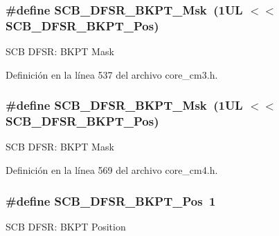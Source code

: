 \subsubsection[{\texorpdfstring{S\+C\+B\+\_\+\+D\+F\+S\+R\+\_\+\+B\+K\+P\+T\+\_\+\+Msk}{SCB_DFSR_BKPT_Msk}}]{\setlength{\rightskip}{0pt plus 5cm}\#define S\+C\+B\+\_\+\+D\+F\+S\+R\+\_\+\+B\+K\+P\+T\+\_\+\+Msk~(1\+U\+L $<$$<$ S\+C\+B\+\_\+\+D\+F\+S\+R\+\_\+\+B\+K\+P\+T\+\_\+\+Pos)}\hypertarget{group___c_m_s_i_s___s_c_b_ga609edf8f50bc49adb51ae28bcecefe1f}{}\label{group___c_m_s_i_s___s_c_b_ga609edf8f50bc49adb51ae28bcecefe1f}
S\+CB D\+F\+SR\+: B\+K\+PT Mask 

Definición en la línea 537 del archivo core\+\_\+cm3.\+h.

\subsubsection[{\texorpdfstring{S\+C\+B\+\_\+\+D\+F\+S\+R\+\_\+\+B\+K\+P\+T\+\_\+\+Msk}{SCB_DFSR_BKPT_Msk}}]{\setlength{\rightskip}{0pt plus 5cm}\#define S\+C\+B\+\_\+\+D\+F\+S\+R\+\_\+\+B\+K\+P\+T\+\_\+\+Msk~(1\+U\+L $<$$<$ S\+C\+B\+\_\+\+D\+F\+S\+R\+\_\+\+B\+K\+P\+T\+\_\+\+Pos)}\hypertarget{group___c_m_s_i_s___s_c_b_ga609edf8f50bc49adb51ae28bcecefe1f}{}\label{group___c_m_s_i_s___s_c_b_ga609edf8f50bc49adb51ae28bcecefe1f}
S\+CB D\+F\+SR\+: B\+K\+PT Mask 

Definición en la línea 569 del archivo core\+\_\+cm4.\+h.

\subsubsection[{\texorpdfstring{S\+C\+B\+\_\+\+D\+F\+S\+R\+\_\+\+B\+K\+P\+T\+\_\+\+Pos}{SCB_DFSR_BKPT_Pos}}]{\setlength{\rightskip}{0pt plus 5cm}\#define S\+C\+B\+\_\+\+D\+F\+S\+R\+\_\+\+B\+K\+P\+T\+\_\+\+Pos~1}\hypertarget{group___c_m_s_i_s___s_c_b_gaf28fdce48655f0dcefb383aebf26b050}{}\label{group___c_m_s_i_s___s_c_b_gaf28fdce48655f0dcefb383aebf26b050}
S\+CB D\+F\+SR\+: B\+K\+PT Position 

